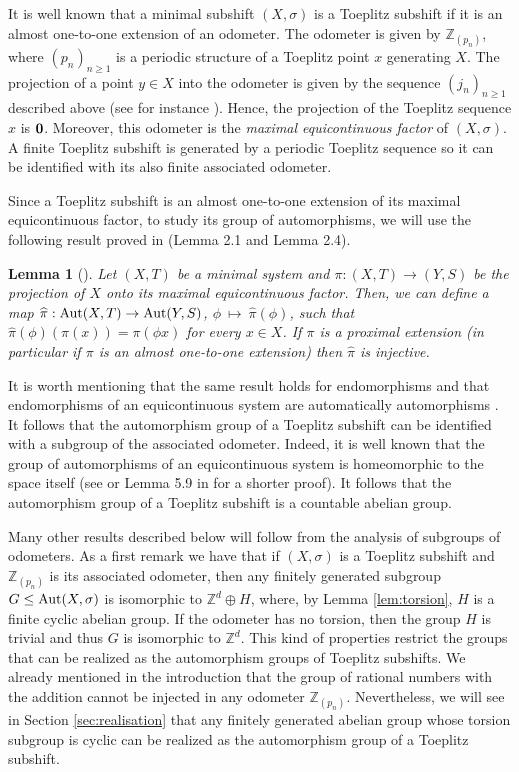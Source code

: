 \documentclass{daj}
\theoremstyle{plain}
\newtheorem{lemma}[theorem]{Lemma}
\theoremstyle{definition}
\begin{document}
It is well known that a minimal subshift $(X,\sigma)$ is a Toeplitz subshift if it is an almost 
one-to-one extension of an odometer. The odometer is given by $\mathbb{Z}_{(p_n)}$, 
where $(p_n)_{n\geq 1}$ is a periodic structure of a Toeplitz point $x$ generating $X$. 
The projection of a point $y \in X$ into the odometer is given by the sequence 
$(j_n)_{n\geq 1}$ described above (see for instance \cite{Williams84}). Hence, the projection of the Toeplitz sequence $x$ is ${\bf 0}$.
Moreover, this odometer is the \emph{maximal equicontinuous factor} of $(X,\sigma)$. 
A finite Toeplitz subshift is generated by a periodic Toeplitz sequence so it can be identified with its also finite associated odometer.

Since a Toeplitz subshift is an almost one-to-one extension of its maximal equicontinuous factor, to study its group of automorphisms, we will use the following result proved in \cite{DonosoDurandMaassPetite} (Lemma 2.1 and Lemma 2.4). 

\begin{lemma}[\cite{DonosoDurandMaassPetite}]\label{lem:AutoExtensiona11} 
	Let $(X,T)$ be a minimal system and $\pi \colon (X,T) \to (Y,S)$ be the projection of $X$ onto its maximal equicontinuous factor. Then, we can define a map  
	$\widehat{\pi}:	{\rm Aut} (X,T)   \to  {\rm Aut} (Y,S)$, 
	$\phi \ \mapsto \ \widehat{\pi}(\phi)$,  
	such that $\widehat{\pi}(\phi)(\pi(x))=\pi(\phi x)$ for every $x\in X$. 
	If $\pi$ is a proximal extension (in particular if $\pi$ is an almost one-to-one extension) 
	then $\widehat{\pi}$ is injective. 
\end{lemma}

It is worth mentioning that the same result holds for endomorphisms and that endomorphisms of an equicontinuous system are automatically automorphisms \cite{Aus63}. It follows that the automorphism group of a Toeplitz subshift can be identified with a subgroup of the associated odometer. Indeed, it is well known that the group of automorphisms of an equicontinuous system is homeomorphic to the space itself (see \cite{Aus63} or Lemma 5.9 in \cite{DonosoDurandMaassPetite} for a shorter proof). It follows that the automorphism group of a Toeplitz subshift is a countable abelian group.  

Many other results described below will follow from the analysis of subgroups of odometers. As a first remark we have that if $(X, \sigma)$ is a Toeplitz subshift and $\mathbb{Z}_{(p_n)}$ is its associated odometer, then any finitely generated subgroup $G \le  {\rm Aut}(X, \sigma)$ is isomorphic to $\mathbb{Z}^d \oplus H$, where, by Lemma \ref{lem:torsion}, $H$ is a finite cyclic abelian group. If the odometer has no torsion, then the group $H$ is trivial and thus $G$ is isomorphic to $\mathbb{Z}^d$.
This kind of properties restrict the groups that can be realized as the automorphism groups of  Toeplitz subshifts. We already mentioned in the introduction  that the group of rational numbers with the addition cannot be injected in any odometer $\mathbb{Z}_{(p_n)}$. Nevertheless,
we will see in Section \ref{sec:realisation} that any finitely generated abelian group 
whose torsion subgroup is cyclic can be realized as the automorphism group of a Toeplitz subshift.
\end{document}
